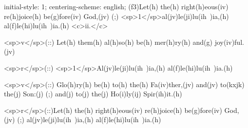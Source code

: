 initial-style: 1;
centering-scheme: english;
(f3)Let(h) the(h) right(h)eous(iv) re(h)joice(h) be(g)fore(iv) God,(jv) (;) <sp>1</sp>al(jv)le(ji)lu(ih~)ia,(h) al(f)le(hi)lu(ih~)ia.(h) <c>ii.</c>

<sp>v</sp>(::) Let(h) them(h) al(h)so(h) be(h) mer(h)ry(h) and(g) joy(iv)ful.(jv)

<sp>r</sp>(::) <sp>1</sp>Al(jv)le(ji)lu(ih~)ia,(h) al(f)le(hi)lu(ih~)ia.(h)

<sp>v</sp>(::) Glo(h)ry(h) be(h) to(h) the(h) Fa(iv)ther,(jv) and(jv) to(kxjk) the(j) Son:(j) (;) and(j) to(j) the(j) Ho(i)ly(ij) Spir(ih)it.(h)

<sp>r</sp>(::)Let(h) the(h) right(h)eous(iv) re(h)joice(h) be(g)fore(iv) God,(jv) (;) al(jv)le(ji)lu(ih~)ia,(h) al(f)le(hi)lu(ih~)ia.(h)